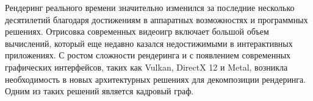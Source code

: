 






Рендеринг реального времени значительно изменился за последние несколько десятилетий благодаря достижениям в аппаратных возможностях и программных решениях. Отрисовка современных видеоигр включает большой объем вычислений, который еще недавно казался недостижимыми в интерактивных приложениях. С ростом сложности рендеринга и с появлением современных графических интерфейсов, таких как Vulkan, DirectX 12 и Metal, возникла необходимость в новых архитектурных решениях для декомпозиции рендеринга. Одним из таких решений является кадровый граф.

